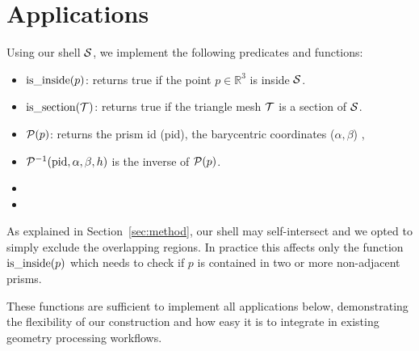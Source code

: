 \section{Applications}
\label{sec:applications}
Using our shell $\S$, we implement the following predicates and functions:
\begin{itemize}
    \item $\isinside(p)$: returns true if the point $p \in \mathbb{R}^3$ is inside $\S$. %
    \item $\issection(\T)$: returns true if the triangle mesh $\T$ is a section of $\S$.
    \item $\P(p)$: returns the prism id (pid), the barycentric coordinates ($\alpha,\beta$) , 
    \item $\P^{-1}(\text{pid},\alpha,\beta,h)$ is the inverse of $\P(p)$.
    \item {}
    \item {}
\end{itemize}

As explained in Section~\ref{sec:method}, our shell may self-intersect and 
we opted to simply exclude the overlapping regions. In practice this affects only the function $\isinside(p)$ which needs to check if $p$ is contained in two or more non-adjacent prisms. 

These functions are sufficient to implement all applications below, demonstrating the flexibility of our construction and how easy it is to integrate in existing geometry processing workflows. %



